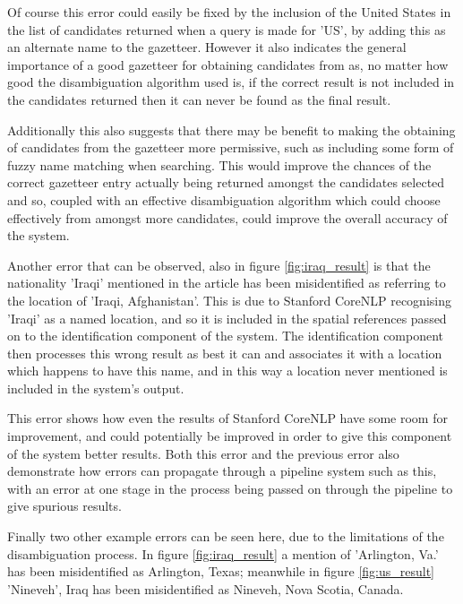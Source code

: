 \documentclass[12pt, a4paper]{report}
\begin{document}
Of course this error could easily be fixed by the inclusion of the United States in the list of candidates returned when a query is made for 'US', by adding this as an alternate name to the gazetteer. However it also indicates the general importance of a good gazetteer for obtaining candidates from as, no matter how good the disambiguation algorithm used is, if the correct result is not included in the candidates returned then it can never be found as the final result.

Additionally this also suggests that there may be benefit to making the obtaining of candidates from the gazetteer more permissive, such as including some form of fuzzy name matching when searching. This would improve the chances of the correct gazetteer entry actually being returned amongst the candidates selected and so, coupled with an effective disambiguation algorithm which could choose effectively from amongst more candidates, could improve the overall accuracy of the system.

 


Another error that can be observed, also in figure \ref{fig:iraq_result} is that the nationality 'Iraqi' mentioned in the article has been misidentified as referring to the location of 'Iraqi, Afghanistan'. This is due to Stanford CoreNLP recognising 'Iraqi' as a named location, and so it is included in the spatial references passed on to the identification component of the system. The identification component then processes this wrong result as best it can and associates it with a location which happens to have this name, and in this way a location never mentioned is included in the system's output.

This error shows how even the results of Stanford CoreNLP have some room for improvement, and could potentially be improved in order to give this component of the system better results. Both this error and the previous error also demonstrate how errors can propagate through a pipeline system such as this, with an error at one stage in the process being passed on through the pipeline to give spurious results.

Finally two other example errors can be seen here, due to the limitations of the disambiguation process. In figure \ref{fig:iraq_result} a mention of 'Arlington, Va.' has been misidentified as Arlington, Texas; meanwhile in figure \ref{fig:us_result} 'Nineveh', Iraq has been misidentified as Nineveh, Nova Scotia, Canada.
\end{document}
